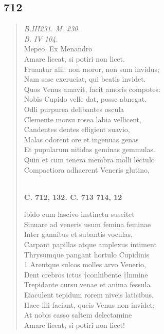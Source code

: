 \documentclass[11pt, a4paper]{report}
\begin{document}
            \subsection*{712}
      \begin{verse}
      \textit{B.III231. M. 230.} \\ \textit{B. IV 104.} \\ Mepeo. Ex Menandro \\ Amare liceat, si potiri non licet. \\ Fruantur alii: non moror, non sum invidus; \\ Nam sese excruciat, qui beatis invidet. \\ Quos Venus amavit, facit amoris compotes: \\ Nobis Cupido velle dat, posse abnegat. \\ Odli purpurea delibantes oscula \\ Clemente morsu rosea labia vellicent, \\ Candentes dentes efligient suavio, \\ Malas odorent ore et ingenuas genas \\ Et pupularum nitidas geminas gemmulas. \\ Quin et cum tenera membra molli lectulo \\ Compactiora adhaerent Veneris glutino, \\ 
        ﻿\pagebreak 
    \begin{center} \textbf{C. 712, 132. C. 713 714, 12} \end{center} \marginpar{[79]} ibido cum lascivo instinctu suscitet \\ Sinuare ad veneris usum femina feminae \\ Inter gannitus et subantis voculas, \\ Carpant papillas atque amplexus intiment \\ Thrysumque pangant hortulo Cupidinis \\ 1 Arentque sulcos molles arvo Venerio, \\ Dent crebros ictus †conhibente †lnmine \\ Trepidante cursu venae et anima fessula \\ Eiaculent tepidum rorem niveis laticibus. \\ Haec illi faciant, queis Venus non invidet; \\ At nobis casso saltem delectamine \\ Amare liceat, si potiri non licet! \\ 
      \end{verse}
  
\end{document}
